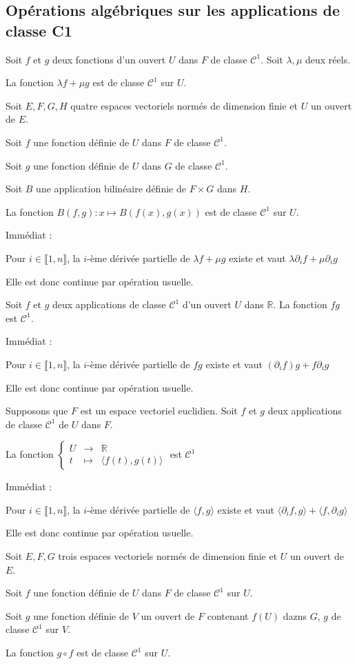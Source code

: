 \documentclass[a4paper,12pt]{book}
\newcommand{\Prop}[2]{\begin{tcolorbox}[sharp corners, colback=white,colframe=red!90!black!75, title=Proposition : #1]#2\end{tcolorbox}}
\newcommand{\Pre}[1]{\begin{tcolorbox}[sharp corners, colback=white,colframe=green!60!green!30!black!75, title=Preuve]#1\end{tcolorbox}}
\def\R{\mathbb{R}}
\begin{document}
\subsection{Opérations algébriques sur les applications de classe C1}
\Prop{}{Soit $f$ et $g$ deux fonctions d'un ouvert $U$ dans $F$ de classe $\mathcal{C}^1$. Soit $\lambda, \mu$ deux réels.
\par La fonction $\lambda f+\mu g$ est de classe $\mathcal{C}^1$ sur $U$.}
\Prop{}{Soit $E,F,G,H$ quatre espaces vectoriels normés de dimension finie et $U$ un ouvert de $E$.
\par Soit $f$ une fonction définie de $U$ dans $F$ de classe $\mathcal{C}^1$.
\par Soit $g$ une fonction définie de $U$ dans $G$ de classe $\mathcal{C}^1$.
\par Soit $B$ une application bilinéaire définie de $F\times G$ dans $H$.
\par La fonction $B(f,g):x\mapsto B(f(x), g(x))$ est de classe $\mathcal{C}^1$ sur $U$.}
\Pre{Immédiat : 
\par Pour $i\in\llbracket 1, n\rrbracket$, la $i$-ème dérivée partielle de $\lambda f+\mu g$ existe et vaut $\lambda\partial_if + \mu\partial_ig$
\par Elle est donc continue par opération usuelle.}
\Prop{}{Soit $f$ et $g$ deux applications de classe $\mathcal{C}^1$ d'un ouvert $U$ dans $\R$. La fonction $fg$ est $\mathcal{C}^1$.}
\Pre{Immédiat :
\par Pour $i\in\llbracket 1, n\rrbracket$, la $i$-ème dérivée partielle de $fg$ existe et vaut $(\partial_if)g + f\partial_ig$
\par Elle est donc continue par opération usuelle.}
\Prop{}{Supposons que $F$ est un espace vectoriel euclidien. Soit $f$ et $g$ deux applications de classe $\mathcal{C}^1$ de $U$ dans $F$.
\par La fonction $\left\{\begin{array}{rcl} U & \to & \R \\ t & \mapsto & \langle f(t), g(t)\rangle\end{array}\right.$ est $\mathcal{C}^1$}
\Pre{Immédiat :
\par Pour $i\in\llbracket 1, n\rrbracket$, la $i$-ème dérivée partielle de $\langle f,g\rangle$ existe et vaut $\langle \partial_if,g\rangle + \langle f,\partial_ig\rangle$
\par Elle est donc continue par opération usuelle.}
\Prop{}{Soit $E,F,G$ trois espaces vectoriels normés de dimension finie et $U$ un ouvert de $E$.
\par Soit $f$ une fonction définie de $U$ dans $F$ de classe $\mathcal{C}^1$ sur $U$.
\par Soit $g$ une fonction définie de $V$ un ouvert de $F$ contenant $f(U)$ dazns $G$, $g$ de classe $\mathcal{C}^1$ sur $V$.
\par La fonction $g\circ f$ est de classe $\mathcal{C}^1$ sur $U$.}
\end{document}
